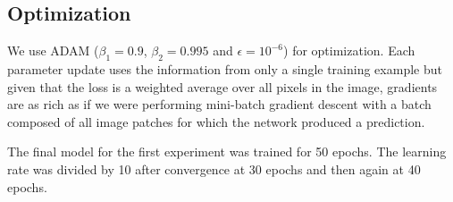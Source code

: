\subsection{Optimization}
We use ADAM ($\beta_1 = 0.9$, $\beta_2 = 0.995$ and $\epsilon = 10^{-6}$) for optimization.
Each parameter update uses the information from only a single training example but given that the loss is a weighted average over all pixels in the image, gradients are as rich as if we were performing mini-batch gradient descent with a batch composed of all image patches for which the network produced a prediction.

The final model for the first experiment was trained for 50 epochs. The learning rate was divided by 10 after convergence at 30 epochs and then again at 40 epochs. 
